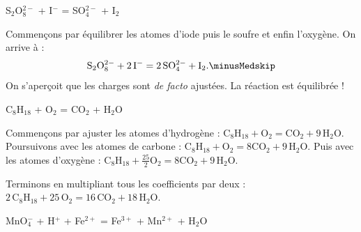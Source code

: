 



\begin{enonce}
S$_2$O$^{2-}_8$ + I$^-$ = SO$^{2-}_4$ + I$_2$
\end{enonce}


\begin{corrige}
Commençons par équilibrer les atomes d'iode puis le soufre et enfin l'oxygène. On arrive à : \minusMedskip
\[
\mathrm{S_2O^{2-}_8}+2\,\mathrm{I^-}=2\,\mathrm{SO^{2-}_4}+\mathrm{I_2}. \minusMedskip
\]
On s'aperçoit que les charges sont \emph{de facto} ajustées. La réaction est équilibrée !
\end{corrige}




\begin{enonce}
C$_8$H$_{18}$ + O$_2$ = CO$_2$ + H$_2$O
\end{enonce}


\begin{corrige}
Commençons par ajuster les atomes d'hydrogène : $\mathrm{C_8H_{18}}+\mathrm{O_2}=\mathrm{CO_2}+9\,\mathrm{H_2O}$.
Poursuivons avec les atomes de  carbone : $\mathrm{C_8H_{18}}+\mathrm{O_2}=8\mathrm{CO_2}+9\,\mathrm{H_2O}$.
Puis avec les atomes d'oxygène : $\mathrm{C_8H_{18}}+\frac{25}{2}\mathrm{O_2}=8\mathrm{CO_2}+9\,\mathrm{H_2O}$.

Terminons en multipliant tous les coefficients par deux : $\mathrm{2\,C_8H_{18}}+25\,\mathrm{O_2}=16\,\mathrm{CO_2}+18\,\mathrm{H_2O}$.
\end{corrige}




\begin{enonce}
MnO$^-_4$ + H$^+$ + Fe$^{2+}$ = Fe$^{3+}$ + Mn$^{2+}$ + H$_2$O
\end{enonce}

